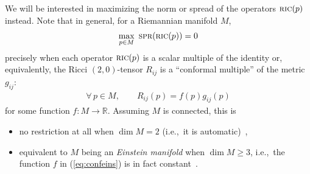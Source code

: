 \documentclass[pdftex]{sigma}%
\numberwithin{equation}{section}
\newcommand{\cat}[1]{\textsc{#1}}
\begin{document}
We will be interested in maximizing the norm or spread of the operators $\cat{ric}(p)$ instead. Note that in general, for a Riemannian manifold $M$,
\begin{gather*}%
\max_{p\in M}~\cat{spr}(\cat{ric}(p))=0
\end{gather*}
precisely when each operator $\cat{ric}(p)$ is a scalar multiple of the identity or, equivalently, the Ricci $(2,0)$-tensor $R_{ij}$ is a ``conformal multiple'' of the metric $g_{ij}$:
\begin{gather}\label{eq:confeins}
 \forall\, p\in M,\qquad R_{ij}(p) = f(p) g_{ij}(p)
\end{gather}
for some function $f\colon M\to \mathbb{R}$. Assuming $M$ is connected, this is
\begin{itemize}\itemsep=0pt
\item no restriction at all when $\dim M=2$ (i.e.,~it is automatic)~\cite[Remark 1.96(a)]{bes},
\item equivalent to $M$ being an {\it Einstein manifold} when $\dim M \ge 3$, i.e.,~the function $f$ in (\ref{eq:confeins}) is in fact constant~\cite[Theorem~1.97]{bes}.
\end{itemize}
\end{document}
